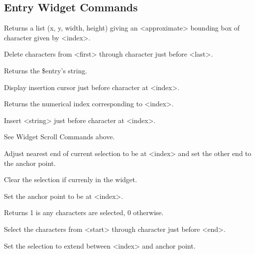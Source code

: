 \subsection*{Entry Widget Commands}
\begin{enum}{1cm}

Returns a list (x, y, width, height) giving an <approximate> 
bounding box of character given by <index>.

Delete characters from <first> through character just before <last>.

Returns the \$entry's string.

Display insertion cursor just before character at <index>.

Returns the numerical index corresponding to <index>.

Insert <string> just before character at <index>.

See Widget Scroll Commands above.

Adjust nearest end of current selection to be at <index> and
set the other end to the anchor point.

Clear the selection if currenly in the widget.

Set the anchor point to be at <index>.

Returns 1 is any characters are selected, 0 otherwise.

Select the characters from <start> through character just before <end>.

Set the selection to extend between <index> and anchor point.

\end{enum}


